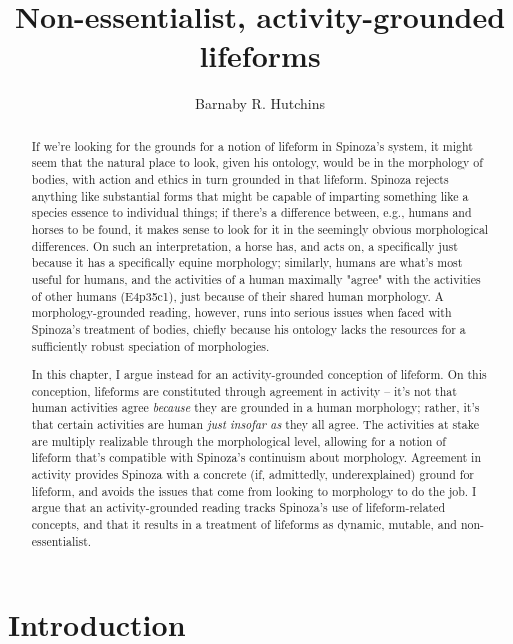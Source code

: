 \documentclass{article}
\title{Non-essentialist, activity-grounded lifeforms}
\author{Barnaby R. Hutchins}
\begin{document}
\maketitle

\begin{abstract}
If we're looking for the grounds for a notion of lifeform in Spinoza's system, it might seem that the natural place to look, given his ontology, would be in the morphology of bodies, with action and ethics in turn grounded in that lifeform. Spinoza rejects anything like substantial forms that might be capable of imparting something like a species essence to individual things; if there's a difference between, e.g., humans and horses to be found, it makes sense to look for it in the seemingly obvious morphological differences. On such an interpretation, a horse has, and acts on, a specifically  just because it has a specifically equine morphology; similarly, humans are what's most useful for humans, and the activities of a human maximally "agree"  with the activities of other humans (E4p35c1), just because of their shared human morphology. A morphology-grounded reading, however, runs into serious issues when faced with Spinoza's treatment of bodies, chiefly because his ontology lacks the resources for a sufficiently robust speciation of morphologies.

In this chapter, I argue instead for an activity-grounded conception of lifeform. On this conception, lifeforms are constituted through agreement in activity – it's not that human activities agree \emph{because} they are grounded in a human morphology; rather, it's that certain activities are human \emph{just insofar as} they all agree. The activities at stake are multiply realizable through the morphological level, allowing for a notion of lifeform that's compatible with Spinoza's continuism about morphology. Agreement in activity provides Spinoza with a concrete (if, admittedly, underexplained) ground for lifeform, and avoids the issues that come from looking to morphology to do the job. I argue that an activity-grounded reading tracks Spinoza's use of lifeform-related concepts, and that it results in a treatment of lifeforms as dynamic, mutable, and non-essentialist.
\end{abstract}

\section{Introduction}
\end{document}
